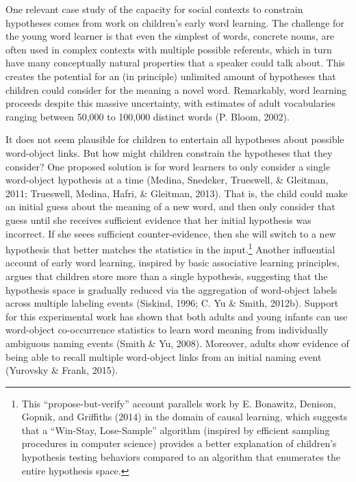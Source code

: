 \documentclass[english,floatsintext,man]{apa6}
\theoremstyle{definition}
\theoremstyle{definition}
\theoremstyle{definition}
\theoremstyle{remark}
\begin{document}
One relevant case study of the capacity for social contexts to constrain
hypotheses comes from work on children's early word learning. The
challenge for the young word learner is that even the simplest of words,
concrete nouns, are often used in complex contexts with multiple
possible referents, which in turn have many conceptually natural
properties that a speaker could talk about. This creates the potential
for an (in principle) unlimited amount of hypotheses that children could
consider for the meaning a novel word. Remarkably, word learning
proceeds despite this massive uncertainty, with estimates of adult
vocabularies ranging between 50,000 to 100,000 distinct words (P. Bloom,
2002).

It does not seem plausible for children to entertain all hypotheses
about possible word-object links. But how might children constrain the
hypotheses that they consider? One proposed solution is for word
learners to only consider a single word-object hypothesis at a time
(Medina, Snedeker, Trueswell, \& Gleitman, 2011; Trueswell, Medina,
Hafri, \& Gleitman, 2013). That is, the child could make an initial
guess about the meaning of a new word, and then only consider that guess
until she receives sufficient evidence that her initial hypothesis was
incorrect. If she seees sufficient counter-evidence, then she will
switch to a new hypothesis that better matches the statistics in the
input.\footnote{This \enquote{propose-but-verify} account parallels work
  by E. Bonawitz, Denison, Gopnik, and Griffiths (2014) in the domain of
  causal learning, which suggests that a \enquote{Win-Stay, Lose-Sample}
  algorithm (inspired by efficient sampling procedures in computer
  science) provides a better explanation of children's hypothesis
  testing behaviors compared to an algorithm that enumerates the entire
  hypothesis space.} Another influential account of early word learning,
inspired by basic associative learning principles, argues that children
store more than a single hypothesis, suggesting that the hypothesis
space is gradually reduced via the aggregation of word-object labels
across multiple labeling events (Siskind, 1996; C. Yu \& Smith, 2012b).
Support for this experimental work has shown that both adults and young
infants can use word-object co-occurrence statistics to learn word
meaning from individually ambiguous naming events (Smith \& Yu, 2008).
Moreover, adults show evidence of being able to recall multiple
word-object links from an initial naming event (Yurovsky \& Frank,
2015).
\end{document}
